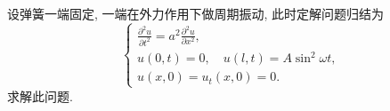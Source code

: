 


\begin{exercise}
  设弹簧一端固定, 一端在外力作用下做周期振动, 此时定解问题归结为
  \[\begin{cases}
    \frac{\partial^2u}{\partial t^2} = a^2 \frac{\partial^2u}{\partial x^2}, \\
    u(0,t) = 0, \quad u(l,t) = A\sin^2\omega t, \\
    u(x,0) = u_t(x,0) = 0.
  \end{cases}\]
  求解此问题.
\end{exercise}

